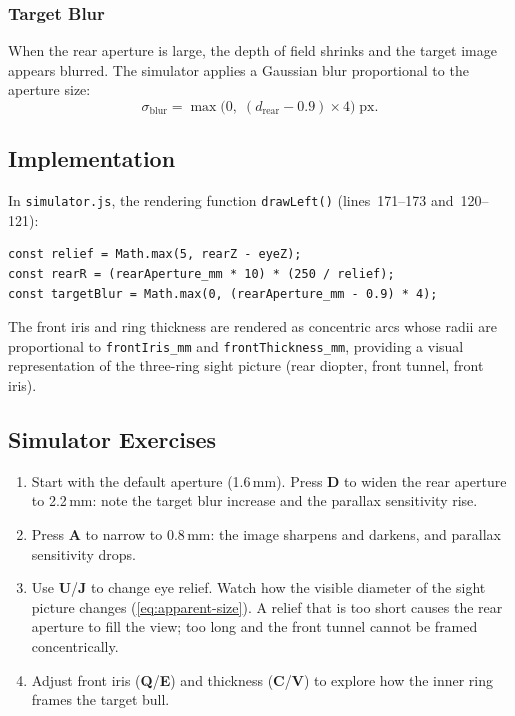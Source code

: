 \documentclass[11pt]{article}
\newcommand{\code}[1]{\texttt{#1}}
\newcommand{\file}[1]{\texttt{#1}}
\newcommand{\key}[1]{\textsf{\textbf{#1}}}
\begin{document}
\subsubsection*{Target Blur}
When the rear aperture is large, the depth of field shrinks and the
target image appears blurred.  The simulator applies a Gaussian blur
proportional to the aperture size:
\begin{equation}\label{eq:blur}
  \sigma_{\text{blur}} = \max\!\bigl(0,\;(d_{\text{rear}} - 0.9) \times 4\bigr)\;\text{px}.
\end{equation}

\subsection{Implementation}
In \file{simulator.js}, the rendering function \code{drawLeft()}
(lines~171--173 and~120--121):
\begin{lstlisting}
const relief = Math.max(5, rearZ - eyeZ);
const rearR = (rearAperture_mm * 10) * (250 / relief);
const targetBlur = Math.max(0, (rearAperture_mm - 0.9) * 4);
\end{lstlisting}

The front iris and ring thickness are rendered as concentric arcs
whose radii are proportional to \code{frontIris\_mm} and
\code{frontThickness\_mm}, providing a visual representation of the
three-ring sight picture (rear diopter, front tunnel, front iris).

\subsection{Simulator Exercises}
\begin{enumerate}[nosep]
  \item Start with the default aperture (1.6\,mm).  Press \key{D} to
        widen the rear aperture to 2.2\,mm: note the target blur
        increase and the parallax sensitivity rise.
  \item Press \key{A} to narrow to 0.8\,mm: the image sharpens and
        darkens, and parallax sensitivity drops.
  \item Use \key{U}/\key{J} to change eye relief.  Watch how the
        visible diameter of the sight picture changes
        (\cref{eq:apparent-size}).  A relief that is too short causes
        the rear aperture to fill the view; too long and the front
        tunnel cannot be framed concentrically.
  \item Adjust front iris (\key{Q}/\key{E}) and thickness
        (\key{C}/\key{V}) to explore how the inner ring frames the
        target bull.
\end{enumerate}
\end{document}

